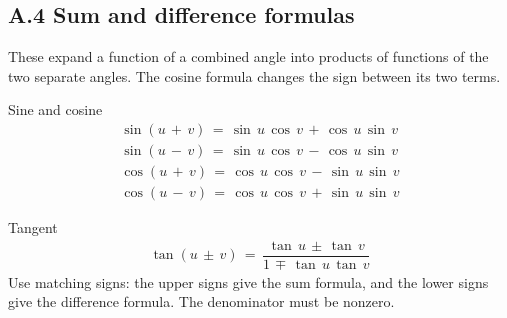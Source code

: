 \documentclass[11pt]{article}
\begin{document}
\begin{keepsection}
\section{A.4 Sum and difference formulas}

These expand a function of a combined angle into products of functions of the two separate angles. The cosine formula changes the sign between its two terms.

\begin{equationcard}{Sine and cosine}
\[ \begin{gathered} \sin ({u}\, +\, {v})\, =\, \sin \, {u}\, \cos \, {v}\, +\, \cos \, {u}\, \sin \, {v} \\ \sin ({u}\, -\, {v})\, =\, \sin \, {u}\, \cos \, {v}\, -\, \cos \, {u}\, \sin \, {v} \\ \cos ({u}\, +\, {v})\, =\, \cos \, {u}\, \cos \, {v}\, -\, \sin \, {u}\, \sin \, {v} \\ \cos ({u}\, -\, {v})\, =\, \cos \, {u}\, \cos \, {v}\, +\, \sin \, {u}\, \sin \, {v} \end{gathered} \]
\end{equationcard}

\begin{equationcard}{Tangent}
\[ \begin{gathered} \tan ({u}\, \pm \, {v})\, =\, \dfrac{\tan \, {u}\, \pm \, \tan \, {v}}{1\, \mp \, \tan \, {u}\, \tan \, {v}} \end{gathered} \]
{\small Use matching signs: the upper signs give the sum formula, and the lower signs give the difference formula. The denominator must be nonzero.}
\end{equationcard}
\end{keepsection}
\end{document}
